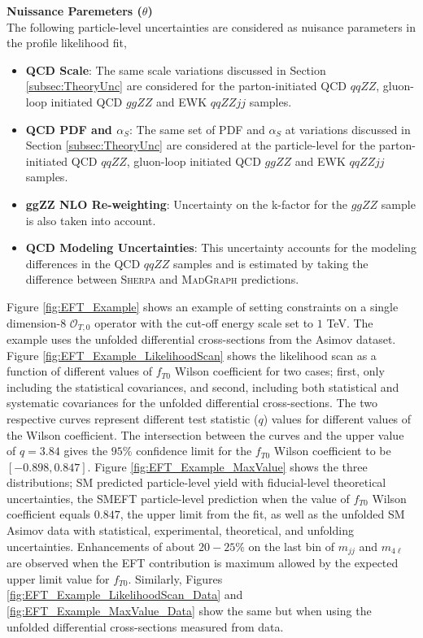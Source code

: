 \textbf{Nuissance Paremeters ($\theta$)} \\
The following particle-level uncertainties are considered as nuisance parameters in the profile likelihood fit,
\begin{itemize}
    \item{\textbf{QCD Scale}: The same scale variations discussed in Section \ref{subsec:TheoryUnc} are considered for the parton-initiated QCD $qqZZ$, gluon-loop initiated QCD $ggZZ$ and EWK $qqZZjj$ samples.} 
    \item{\textbf{QCD PDF and $\alpha_{S}$}: The same set of PDF and $\alpha_{S}$ at variations discussed in Section \ref{subsec:TheoryUnc} are considered at the particle-level for the parton-initiated QCD $qqZZ$, gluon-loop initiated QCD $ggZZ$ and EWK $qqZZjj$ samples. }
    \item{\textbf{ggZZ NLO Re-weighting}: Uncertainty on the k-factor for the $ggZZ$ sample is also taken into account. }
    \item{\textbf{QCD Modeling Uncertainties}: This uncertainty accounts for the modeling differences in the QCD $qqZZ$ samples and is estimated by taking the difference between \textsc{Sherpa} and \textsc{MadGraph} predictions.} 
\end{itemize}

Figure \ref{fig:EFT_Example} shows an example of setting constraints on a single dimension-8 $\mathcal{O}_{T,0}$ operator with the cut-off energy scale set to $1$ TeV. The example uses the unfolded differential cross-sections from the Asimov dataset. Figure \ref{fig:EFT_Example_LikelihoodScan} shows the likelihood scan as a function of different values of $f_{T0}$ Wilson coefficient for two cases; first, only including the statistical covariances, and second, including both statistical and systematic covariances for the unfolded differential cross-sections. The two respective curves represent different test statistic ($q$) values for different values of the Wilson coefficient. The intersection between the curves and the upper value of $q=3.84$ gives the $95\%$ confidence limit for the $f_{T0}$ Wilson coefficient to be $[-0.898,0.847]$. Figure \ref{fig:EFT_Example_MaxValue} shows the three distributions; SM predicted particle-level yield with fiducial-level theoretical uncertainties, the SMEFT particle-level prediction when the value of $f_{T0}$ Wilson coefficient equals $0.847$, the upper limit from the fit, as well as the unfolded SM Asimov data with statistical, experimental, theoretical, and unfolding uncertainties. Enhancements of about $20-25\%$ on the last bin of $m_{jj}$ and $m_{4\ell}$ are observed when the EFT contribution is maximum allowed by the expected upper limit value for $f_{T0}$. Similarly, Figures \ref{fig:EFT_Example_LikelihoodScan_Data} and \ref{fig:EFT_Example_MaxValue_Data} show the same but when using the unfolded differential cross-sections measured from data. 

